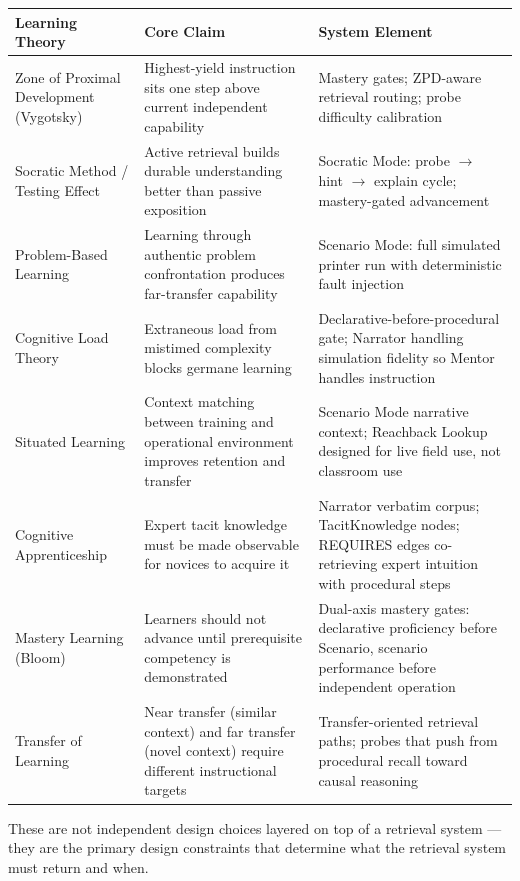 \documentclass[11pt,letterpaper]{article}
\newcommand{\arrowto}{$\rightarrow$}
\begin{document}
\begin{center}
\begin{tabularx}{\textwidth}{@{}l X X@{}}
\toprule
\textbf{Learning Theory} & \textbf{Core Claim} & \textbf{System Element} \\
\midrule
Zone of Proximal Development (Vygotsky) & Highest-yield instruction sits one step above current independent capability & Mastery gates; ZPD-aware retrieval routing; probe difficulty calibration \\
Socratic Method / Testing Effect & Active retrieval builds durable understanding better than passive exposition & Socratic Mode: probe \arrowto{} hint \arrowto{} explain cycle; mastery-gated advancement \\
Problem-Based Learning & Learning through authentic problem confrontation produces far-transfer capability & Scenario Mode: full simulated printer run with deterministic fault injection \\
Cognitive Load Theory & Extraneous load from mistimed complexity blocks germane learning & Declarative-before-procedural gate; Narrator handling simulation fidelity so Mentor handles instruction \\
Situated Learning & Context matching between training and operational environment improves retention and transfer & Scenario Mode narrative context; Reachback Lookup designed for live field use, not classroom use \\
Cognitive Apprenticeship & Expert tacit knowledge must be made observable for novices to acquire it & Narrator verbatim corpus; TacitKnowledge nodes; REQUIRES edges co-retrieving expert intuition with procedural steps \\
Mastery Learning (Bloom) & Learners should not advance until prerequisite competency is demonstrated & Dual-axis mastery gates: declarative proficiency before Scenario, scenario performance before independent operation \\
Transfer of Learning & Near transfer (similar context) and far transfer (novel context) require different instructional targets & Transfer-oriented retrieval paths; probes that push from procedural recall toward causal reasoning \\
\bottomrule
\end{tabularx}
\end{center}

These are not independent design choices layered on top of a retrieval system --- they are the primary design constraints that determine what the retrieval system must return and when.
\end{document}
